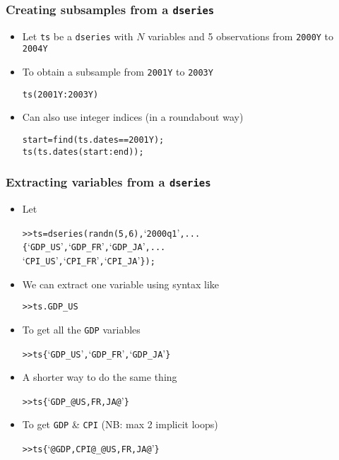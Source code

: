 \documentclass[10pt]{beamer}
\newcommand{\myitem}{\item[$\bullet$]}
\begin{document}
\begin{frame}[fragile,t]
  \frametitle{Creating subsamples from a \texttt{dseries}}
  \begin{itemize}
    \myitem Let \texttt{ts} be a \texttt{dseries} with $N$ variables and 5
    observations from \texttt{2000Y} to \texttt{2004Y}
    \myitem To obtain a subsample from \texttt{2001Y} to \texttt{2003Y}
    \begin{alltt}
  ts(2001Y:2003Y)
    \end{alltt}
    \myitem Can also use integer indices (in a roundabout way)
    \begin{alltt}
  start = find(ts.dates==2001Y);
  ts(ts.dates(start:end));
    \end{alltt}
  \end{itemize}
\end{frame}



\begin{frame}[fragile,t]
  \frametitle{Extracting variables from a \texttt{dseries}}
  \begin{itemize}
    \myitem Let
    \begin{alltt}
  >> ts = dseries(randn(5,6), `2000q1', ...
                 \{`GDP_US', `GDP_FR', `GDP_JA', ...
                  `CPI_US', `CPI_FR', `CPI_JA'\});
    \end{alltt}
    \myitem We can extract one variable using syntax like
    \begin{alltt}
  >> ts.GDP_US
    \end{alltt}
    \myitem To get all the \texttt{GDP} variables
    \begin{alltt}
  >> ts\{`GDP_US', `GDP_FR', `GDP_JA'\}
    \end{alltt}
    \myitem A shorter way to do the same thing
    \begin{alltt}
  >> ts\{`GDP_@US,FR,JA@'\}
    \end{alltt}
    \myitem To get \texttt{GDP} \& \texttt{CPI} (NB: max 2 implicit loops)
    \begin{alltt}
  >> ts\{`@GDP,CPI@_@US,FR,JA@'\}
    \end{alltt}
  \end{itemize}
\end{frame}
\end{document}
